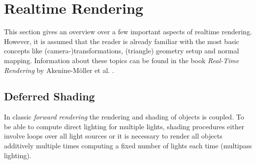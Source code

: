 \documentclass[thesis.tex]{subfiles}
\begin{document}
\section{Realtime Rendering}
This section gives an overview over a few important aspects of realtime rendering.
However, it is assumed that the reader is already familiar with the most basic concepts like (camera-)transformations, (triangle) geometry setup and normal mapping.
Information about these topics can be found in the book \emph{Real-Time Rendering} by Akenine-M\"{o}ller et al. \cite{bib:RealtimeRenderingBook}. %


\subsection{Deferred Shading}
In classic \emph{forward rendering} the rendering and shading of objects is coupled.
To be able to compute direct lighting for multiple lights, shading procedures either involve loops over all light sources or it is necessary to render all objects additively multiple times computing a fixed number of lights each time (multipass lighting).
\end{document}
